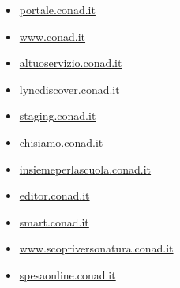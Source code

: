 \documentclass{article}
\begin{document}
\begin{itemize}
        
        
        \item \href{ https://portale.conad.it/my.policy }{ portale.conad.it }
    
        
        
        \item \href{ https://www.conad.it/assets/common/volantini/pac/v2023-/2023-5-Integrativa-Umbria.pdf\%3F\_u\%3D1677679008259 }{ www.conad.it }
    
        
        
        \item \href{ https://altuoservizio.conad.it/login.html }{ altuoservizio.conad.it }
    
        
        
        \item \href{ https://lyncdiscover.conad.it/ }{ lyncdiscover.conad.it }
    
        
        
        \item \href{ http://staging.conad.it/ }{ staging.conad.it }
    
        
        
        \item \href{ https://chisiamo.conad.it/ }{ chisiamo.conad.it }
    
        
        
        \item \href{ https://insiemeperlascuola.conad.it/atpc/insiemeperlascuola/j/home }{ insiemeperlascuola.conad.it }
    
        
        
        \item \href{ https://editor.conad.it/libs/granite/core/content/login.html?resource=\%2F\&$$login$$=\%24\%24login\%24\%24\&j\_reason=unknown\&j\_reason\_code=unknown }{ editor.conad.it }
    
        
        
        \item \href{ http://smart.conad.it }{ smart.conad.it }
    
        
        
        \item \href{ https://www.scopriversonatura.conad.it/ }{ www.scopriversonatura.conad.it }
    
        
        
        \item \href{ https://spesaonline.conad.it/ }{ spesaonline.conad.it }
    

\end{itemize}
\end{document}
